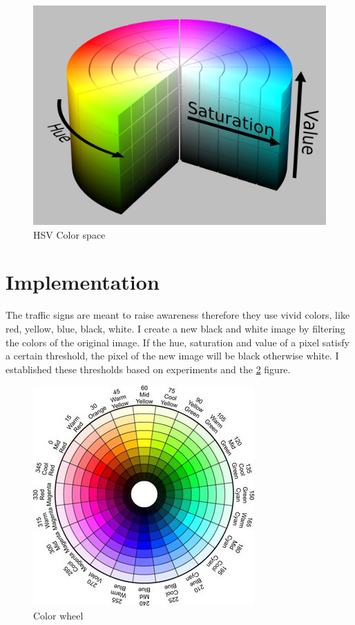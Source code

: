 \begin{figure}[h]
\centering

\includegraphics[scale=0.1]{HSVColorSpace}
\caption{HSV Color space}

\label{fig:HSVColorSpace}
\end{figure}

\section{Implementation}\label{sec:PREPROC:implement}



The traffic signs are meant to raise awareness therefore they use vivid colors, like red, yellow, blue, black, white. I create a new black and white image by filtering the colors of the original image. If the hue, saturation and value of a pixel satisfy a certain threshold, the pixel of the new image will be black otherwise white. I established these thresholds based on experiments and the \ref{fig:colorWheel} figure.

\begin{figure}[h]

\centering 
\includegraphics[scale=0.5]{ColorWheel}
\caption{Color wheel}
\label{fig:colorWheel} 

\end{figure}

